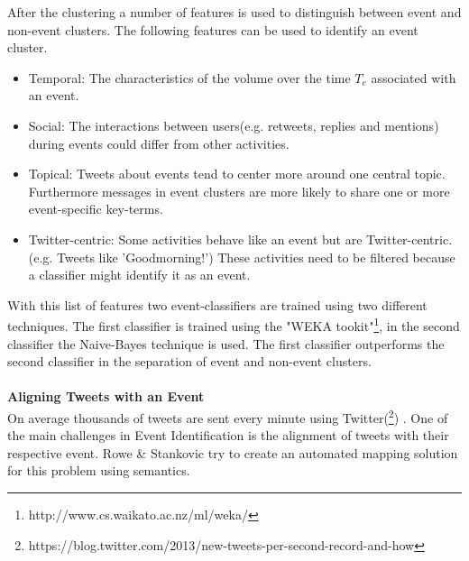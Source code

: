 \documentclass{article}
\begin{document}
After the clustering a number of features is used to distinguish between event and non-event clusters. The following features can be used to identify an event cluster. \cite{eventident} 
\begin{itemize}
  \item Temporal: The characteristics of the volume over the time $T_e$ associated with an event. 
  \item Social: The interactions between users(e.g. retweets, replies and mentions) during events could differ from other activities. 
  \item Topical: Tweets about events tend to center more around one central topic. Furthermore messages in event clusters are more likely to share one or more event-specific key-terms.  
  \item Twitter-centric: Some activities behave like an event but are Twitter-centric.(e.g. Tweets like 'Goodmorning!') These activities need to be filtered because a classifier might identify it as an event. 
\end{itemize}

With this list of features two event-classifiers are trained using two different techniques. The first classifier is trained using the "WEKA tookit"\footnote{http://www.cs.waikato.ac.nz/ml/weka/}, in the second classifier the  Naive-Bayes technique is used. The first classifier outperforms the second classifier in the separation of event and non-event clusters. \cite{eventident}
\\\\
\textbf{Aligning Tweets with an Event} \\
On average thousands of tweets are sent every minute using Twitter(\footnote{https://blog.twitter.com/2013/new-tweets-per-second-record-and-how}) . One of the main challenges in Event Identification is the alignment of tweets with their respective event. Rowe \& Stankovic try to create an automated mapping solution for this problem using semantics. \cite{eventalign}
\end{document}
